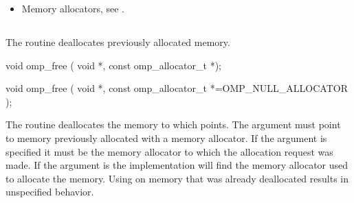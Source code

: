 \begin{ccppspecific}
\crossreferences
\begin{itemize}
\item Memory allocators, see .
\end{itemize}

\subsection{}
\label{subsec:omp_free}

\summary
The  routine deallocates previously allocated memory. 

\format

\begin{cspecific}
\begin{ompcFunction}
void omp_free ( void *, const omp_allocator_t *);
\end{ompcFunction}
\end{cspecific}
\begin{cppspecific}
\begin{ompcFunction}
void omp_free (
  void *,
  const omp_allocator_t *=OMP_NULL_ALLOCATOR
);
\end{ompcFunction}
\end{cppspecific}

\effect

The  routine deallocates the memory to which  points. The  argument must point to memory previously allocated with a memory allocator. If the  argument is specified it must be the memory allocator to which the allocation request was made. If the  argument is  the implementation will find the memory allocator used to allocate the memory. Using  on memory that was already deallocated results in unspecified behavior.

\end{ccppspecific}
